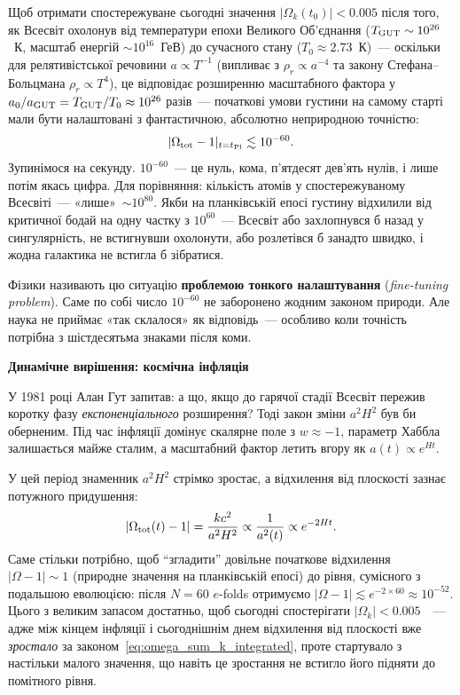Щоб отримати спостережуване сьогодні значення $|\Omega_k(t_0)| < 0.005$
після того, як Всесвіт охолонув від температури епохи
Великого Об'єднання ($T_{\rm GUT} \sim 10^{26}$~К, масштаб енергій
${\sim}10^{16}$~ГеВ) до сучасного стану ($T_0 \approx 2.73$~К)~---
оскільки для релятивістської речовини $a \propto T^{-1}$
(випливає з $\rho_r \propto a^{-4}$ та закону Стефана--Больцмана
$\rho_r \propto T^4$), це відповідає розширенню масштабного фактора
у $a_0/a_{\rm GUT} = T_{\rm GUT}/T_0 \approx 10^{26}$ разів~--- початкові умови густини
на самому старті мали бути налаштовані з фантастичною,
абсолютно неприродною точністю:
\begin{equation*}
  |\Omega_{\rm tot} - 1|_{t = t_{\rm Pl}} \lesssim 10^{-60}.
\end{equation*}
Зупинімося на секунду.
$10^{-60}$~--- це нуль, кома, п'ятдесят дев'ять нулів, і лише потім
якась цифра. Для порівняння: кількість атомів у спостережуваному Всесвіті~---
«лише»~${\sim}10^{80}$. Якби на планківській епосі
густину відхилили від критичної бодай на одну частку з $10^{60}$~--- Всесвіт
або захлопнувся б назад у сингулярність, не встигнувши охолонути,
або розлетівся б занадто швидко, і жодна галактика не встигла б зібратися.

Фізики називають цю ситуацію \textbf{проблемою тонкого налаштування}
(\emph{fine-tuning problem}).
Саме по собі число $10^{-60}$ не заборонено жодним законом природи.
Але наука не приймає «так склалося» як відповідь~--- особливо
коли точність потрібна з шістдесятьма знаками після коми.

\begin{keybox}
\textbf{Динамічне вирішення: космічна інфляція~\cite{linde_1982,albrecht_1982}}

У 1981 році Алан Гут запитав: а що, якщо до гарячої стадії
Всесвіт пережив коротку фазу \emph{експоненціального} розширення?
Тоді закон зміни $a^2H^2$ був би оберненим.
Під час інфляції домінує скалярне поле з $w \approx -1$,
параметр Хаббла залишається майже сталим,
а масштабний фактор летить вгору як $a(t) \propto e^{Ht}$.

У цей період знаменник $a^2H^2$ стрімко зростає, а відхилення від плоскості зазнає потужного придушення:
\begin{equation}
  |\Omega_{\rm tot}(t) - 1| = \frac{kc^2}{a^2 H^2} \propto \frac{1}{a^2(t)} \propto e^{-2Ht}.
\end{equation}
Саме стільки потрібно, щоб \enquote{згладити} довільне початкове відхилення
$|\Omega-1| \sim 1$ (природне значення на планківській епосі) до рівня,
сумісного з подальшою еволюцією: після $N = 60$ $e$-folds отримуємо
$|\Omega-1| \lesssim e^{-2 \times 60} \approx 10^{-52}$.
Цього з великим запасом достатньо, щоб сьогодні спостерігати
$|\Omega_k| < 0.005$~\cite{planck_2018}~--- адже між кінцем інфляції
і сьогоднішнім днем відхилення від плоскості вже \emph{зростало}
за законом~\eqref{eq:omega_sum_k_integrated}, проте стартувало з
настільки малого значення, що навіть це зростання не встигло його
підняти до помітного рівня.
\end{keybox}

